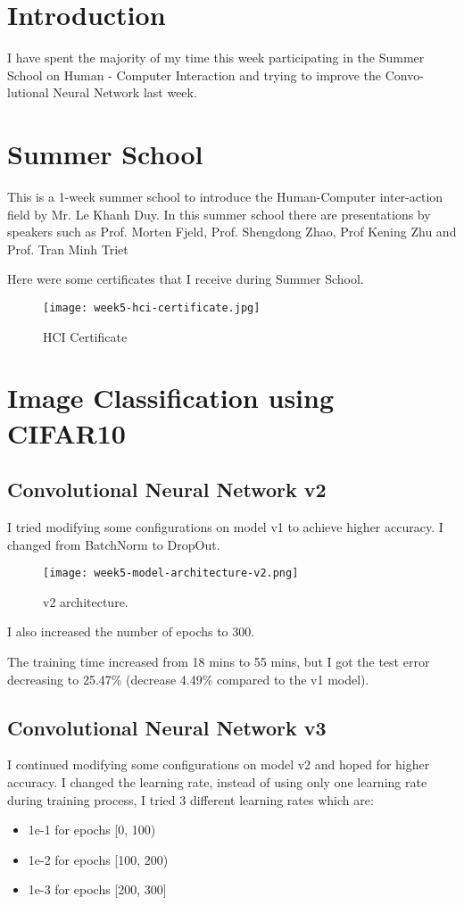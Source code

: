 \section{Introduction}
I have spent the majority of my time this week participating in the Summer School on Human - Computer Interaction and trying to improve the Convo-lutional Neural Network last week.

\section{Summer School}
This is a 1-week summer school to introduce the Human-Computer inter-action field by Mr. Le Khanh Duy. In this summer school there are presentations by speakers such as Prof. Morten Fjeld, Prof. Shengdong Zhao, Prof Kening Zhu and Prof. Tran Minh Triet

Here were some certificates that I receive during Summer School.

\begin{figure}[!ht]
\centering
\texttt{[image: week5-hci-certificate.jpg]}
\caption{HCI Certificate}
\end{figure}

\section{Image Classification using CIFAR10}
\subsection{Convolutional Neural Network v2}
I tried modifying some configurations on model v1 to achieve higher accuracy. I changed from BatchNorm\cite{batchnorm} to DropOut.

\newpage
\begin{figure}[!ht]
\centering
\texttt{[image: week5-model-architecture-v2.png]}
\caption{v2 architecture.}
\end{figure}

I also increased the number of epochs to 300.

The training time increased from 18 mins to 55 mins, but I got the test error decreasing to 25.47\% (decrease 4.49\% compared to the v1 model).

\subsection{Convolutional Neural Network v3}
I continued modifying some configurations on model v2 and hoped for higher accuracy. I changed the learning rate, instead of using only one learning rate during training process, I tried 3 different learning rates which are:
\begin{itemize}
\item 1e-1 for epochs [0, 100)
\item 1e-2 for epochs [100, 200)
\item 1e-3 for epochs [200, 300]
\end{itemize}

